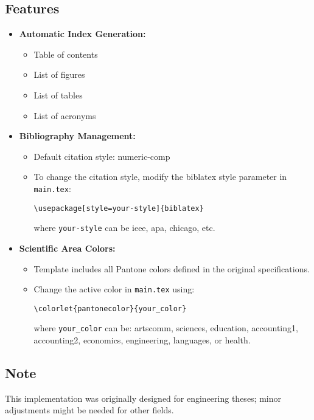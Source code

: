 \subsection{Features}
\begin{itemize}
    \item \textbf{Automatic Index Generation:}
    \begin{itemize}
        \item Table of contents
        \item List of figures
        \item List of tables
        \item List of acronyms
    \end{itemize}
    
    \item \textbf{Bibliography Management:}
    \begin{itemize}
        \item Default citation style: numeric-comp
        \item To change the citation style, modify the biblatex style parameter in \texttt{main.tex}:
        \begin{verbatim}
\usepackage[style=your-style]{biblatex}
        \end{verbatim}
        where \texttt{your-style} can be ieee, apa, chicago, etc.
    \end{itemize}
    
    \item \textbf{Scientific Area Colors:}
    \begin{itemize}
        \item Template includes all Pantone colors defined in the original specifications.
        \item Change the active color in \texttt{main.tex} using:
        \begin{verbatim}
\colorlet{pantonecolor}{your_color}
        \end{verbatim}
        where \texttt{your\_color} can be: artscomm, sciences, education, accounting1, accounting2, economics, engineering, languages, or health.
    \end{itemize}
\end{itemize}

\subsection{Note}
This implementation was originally designed for engineering theses; minor adjustments might be needed for other fields.